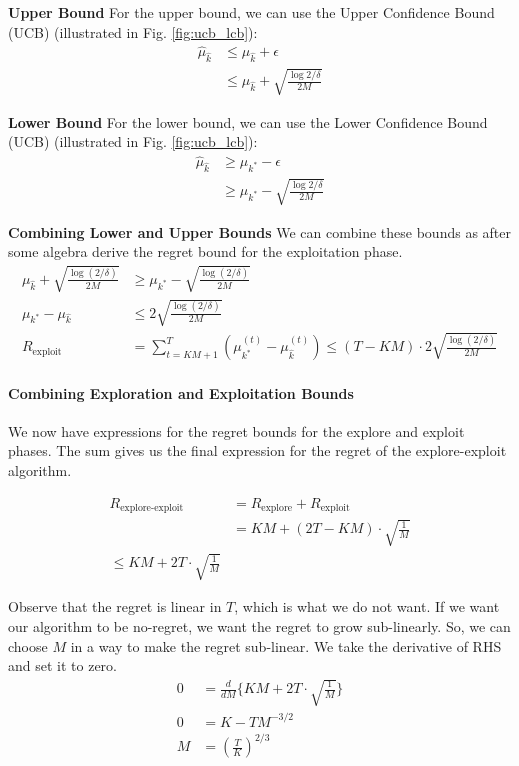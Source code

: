 \documentclass[11pt]{article}
\begin{document}
\textbf{Upper Bound} For the upper bound, we can use the Upper Confidence Bound (UCB) (illustrated
in Fig. \ref{fig:ucb_lcb}):
\begin{align*}
\hat{\mu}_{\hat{k}} &\leq \mu_{\hat{k}} + \epsilon\\
&\leq \mu_{\hat{k}} + \sqrt{\frac{\log{2/\delta}}{2M}}
\end{align*}

\textbf{Lower Bound} For the lower bound, we can use the Lower Confidence Bound (UCB) (illustrated
in Fig. \ref{fig:ucb_lcb}):
\begin{align*}
\hat{\mu}_{\hat{k}} &\geq \mu_{k^*} - \epsilon\\
&\geq \mu_{k^*} - \sqrt{\frac{\log{2/\delta}}{2M}}
\end{align*}

\textbf{Combining Lower and Upper Bounds} We can combine these bounds as after some algebra derive the regret bound for the exploitation
phase.
\begin{align*}
\mu_{\hat{k}} + \sqrt{\frac{\log (2/\delta)}{2M}} &\geq \mu_{k^*} - \sqrt{\frac{\log (2/\delta)}{2M}}\\
\mu_{k^*} - \mu_{\hat{k}} &\leq 2 \sqrt{\frac{\log (2/\delta)}{2M}}\\
R_{\text{exploit}} &= \sum_{t=KM+1}^T (\mu_{k^*}^{(t)} - \mu_{\hat{k}}^{(t)}) \leq (T - KM) \cdot 2 \sqrt{\frac{\log (2/\delta)}{2M}}
\end{align*}

\paragraph{Combining Exploration and Exploitation Bounds}
We now have expressions for the regret bounds for the explore and exploit phases. The sum gives
us the final expression for the regret of the explore-exploit algorithm.

\begin{align*}
    R_{\text{explore-exploit}} &= R_{\text{explore}} + R_{\text{exploit}}\\
    &= KM + (2T - KM) \cdot \sqrt{\frac{1}{M}}\\
    \leq KM + 2T \cdot \sqrt{\frac{1}{M}}
\end{align*}

Observe that the regret is linear in $T$, which is what we do not want. If we want our
algorithm to be no-regret, we want the regret to grow sub-linearly. So, we can choose
$M$ in a way to make the regret sub-linear. We take the derivative of RHS and set it to zero.
\begin{align*}
    0 &= \frac{d}{dM} \Big\{ KM + 2T \cdot \sqrt{\frac{1}{M}} \Big\}\\
    0 &= K - TM^{-3/2}\\
    M &= \left( \frac{T}{K} \right)^{2/3}\\
\end{align*}
\end{document}
